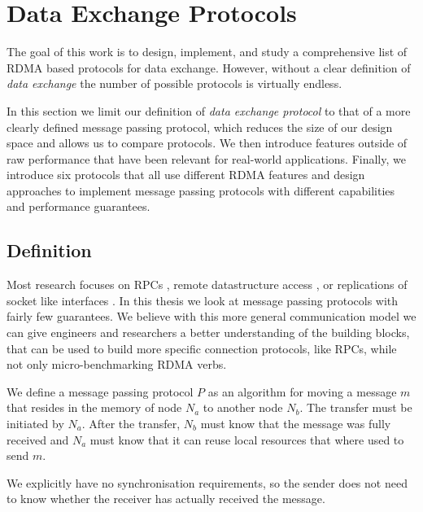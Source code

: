 \section{Data Exchange Protocols}\label{sec:protocols}
The goal of this work is to design, implement, and study a comprehensive list of RDMA based protocols for data exchange. 
However, without a clear definition of \emph{data exchange} the number of possible protocols is virtually endless.

In this section we limit our definition of \emph{data exchange protocol} to that of a more clearly defined message passing
protocol, which reduces the size of our design space and allows us to compare protocols. We then introduce
features outside of raw performance that have been relevant for real-world applications. Finally, we introduce six 
protocols that all use different RDMA features and design approaches to implement message passing protocols with different 
capabilities and performance guarantees.

\subsection{Definition}\label{sec:proto-def}

Most research focuses on RPCs \cite{anuj-guide, fasst, herd}, remote datastructure access \cite{pilaf, farm}, or replications of
socket like interfaces \cite{socksdirect}. In this thesis we look at message passing protocols with fairly few guarantees.
We believe with this more general communication model we can give engineers and researchers a better understanding of the 
building blocks, that can be  used to build more specific connection protocols, like RPCs, while not only 
micro-benchmarking RDMA verbs.


\begin{defn}
We define a message passing protocol $P$ as an algorithm for moving a message $m$ that resides in the memory of
node $N_a$ to another node $N_b$. The transfer must be initiated by $N_a$. After the transfer, $N_b$ must know that the 
message was fully received and $N_a$ must know that it can reuse local resources that where used to send $m$.
\end{defn}

We explicitly have no synchronisation requirements, so the sender does not need to know whether the receiver has actually 
received the message.



\pagebreak

